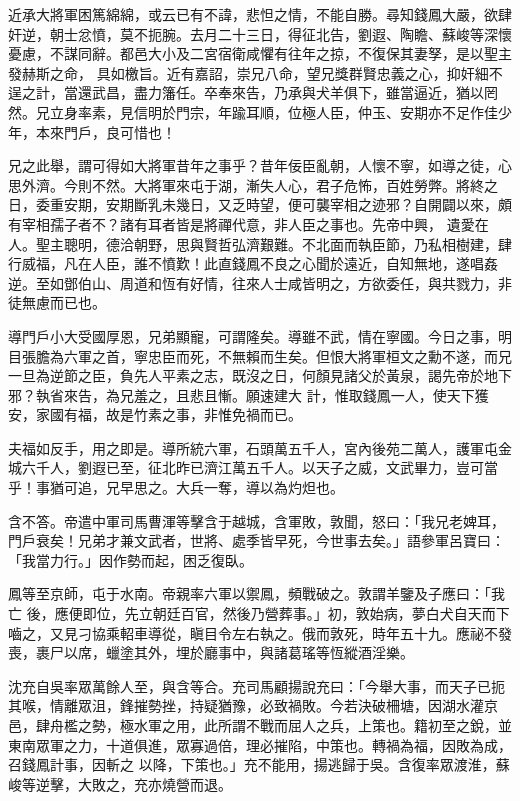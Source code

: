 \begin{pinyinscope}
 近承大將軍困篤綿綿，或云已有不諱，悲怛之情，不能自勝。尋知錢鳳大嚴，欲肆奸逆，朝士忿憤，莫不扼腕。去月二十三日，得征北告，劉遐、陶瞻、蘇峻等深懷憂慮，不謀同辭。都邑大小及二宮宿衛咸懼有往年之掠，不復保其妻孥，是以聖主發赫斯之命，
 具如檄旨。近有嘉詔，崇兄八命，望兄獎群賢忠義之心，抑奸細不逞之計，當還武昌，盡力籓任。卒奉來告，乃承與犬羊俱下，雖當逼近，猶以罔然。兄立身率素，見信明於門宗，年踰耳順，位極人臣，仲玉、安期亦不足作佳少年，本來門戶，良可惜也！



 兄之此舉，謂可得如大將軍昔年之事乎？昔年佞臣亂朝，人懷不寧，如導之徒，心思外濟。今則不然。大將軍來屯于湖，漸失人心，君子危怖，百姓勞弊。將終之日，委重安期，安期斷乳未幾日，又乏時望，便可襲宰相之迹邪？自開闢以來，頗有宰相孺子者不？諸有耳者皆是將禪代意，非人臣之事也。先帝中興，
 遺愛在人。聖主聰明，德洽朝野，思與賢哲弘濟艱難。不北面而執臣節，乃私相樹建，肆行威福，凡在人臣，誰不憤歎！此直錢鳳不良之心聞於遠近，自知無地，遂唱姦逆。至如鄧伯山、周道和恆有好情，往來人士咸皆明之，方欲委任，與共戮力，非徒無慮而已也。



 導門戶小大受國厚恩，兄弟顯寵，可謂隆矣。導雖不武，情在寧國。今日之事，明目張膽為六軍之首，寧忠臣而死，不無賴而生矣。但恨大將軍桓文之勳不遂，而兄一旦為逆節之臣，負先人平素之志，既沒之日，何顏見諸父於黃泉，謁先帝於地下邪？執省來告，為兄羞之，且悲且慚。願速建大
 計，惟取錢鳳一人，使天下獲安，家國有福，故是竹素之事，非惟免禍而已。



 夫福如反手，用之即是。導所統六軍，石頭萬五千人，宮內後苑二萬人，護軍屯金城六千人，劉遐已至，征北昨已濟江萬五千人。以天子之威，文武畢力，豈可當乎！事猶可追，兄早思之。大兵一奪，導以為灼炟也。



 含不答。帝遣中軍司馬曹渾等擊含于越城，含軍敗，敦聞，怒曰：「我兄老婢耳，門戶衰矣！兄弟才兼文武者，世將、處季皆早死，今世事去矣。」語參軍呂寶曰：「我當力行。」因作勢而起，困乏復臥。



 鳳等至京師，屯于水南。帝親率六軍以禦鳳，頻戰破之。敦謂羊鑒及子應曰：「我亡
 後，應便即位，先立朝廷百官，然後乃營葬事。」初，敦始病，夢白犬自天而下嚙之，又見刁協乘軺車導從，瞋目令左右執之。俄而敦死，時年五十九。應祕不發喪，裹尸以席，蠟塗其外，埋於廳事中，與諸葛瑤等恆縱酒淫樂。



 沈充自吳率眾萬餘人至，與含等合。充司馬顧揚說充曰：「今舉大事，而天子已扼其喉，情離眾沮，鋒摧勢挫，持疑猶豫，必致禍敗。今若決破柵塘，因湖水灌京邑，肆舟檻之勢，極水軍之用，此所謂不戰而屈人之兵，上策也。籍初至之銳，並東南眾軍之力，十道俱進，眾寡過倍，理必摧陷，中策也。轉禍為福，因敗為成，召錢鳳計事，因斬之
 以降，下策也。」充不能用，揚逃歸于吳。含復率眾渡淮，蘇峻等逆擊，大敗之，充亦燒營而退。




\end{pinyinscope}
